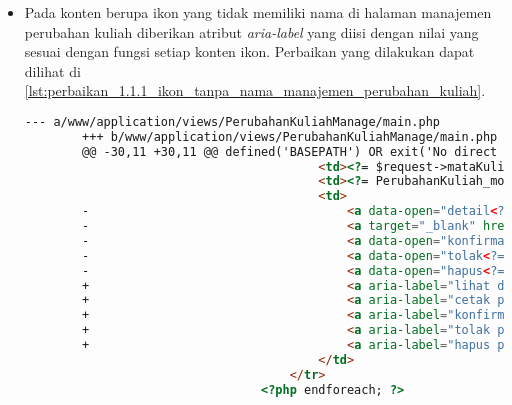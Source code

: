 \begin{itemize}
    \item Pada konten berupa ikon yang tidak memiliki nama di halaman manajemen perubahan kuliah diberikan atribut \textit{aria-label} yang diisi dengan nilai yang sesuai dengan fungsi setiap konten ikon. Perbaikan yang dilakukan dapat dilihat di \ref{lst:perbaikan_1.1.1_ikon_tanpa_nama_manajemen_perubahan_kuliah}.
    \begin{lstlisting}[frame=single, label={lst:perbaikan_1.1.1_ikon_tanpa_nama_manajemen_perubahan_kuliah}, language=HTML, caption=Perbaikan Kriteria Sukses 1.1.1 - Ikon Tanpa Nama di Halaman Manajemen Perubahan Kuliah]
        --- a/www/application/views/PerubahanKuliahManage/main.php
        +++ b/www/application/views/PerubahanKuliahManage/main.php
        @@ -30,11 +30,11 @@ defined('BASEPATH') OR exit('No direct script access allowed');
                                         <td><?= $request->mataKuliahCode ?></td>
                                         <td><?= PerubahanKuliah_model::CHANGETYPE_TYPES[$request->changeType] ?></td>
                                         <td>
        -                                    <a data-open="detail<?= $request->id ?>"><i class="fi-eye"></i></a>
        -                                    <a target="_blank" href="/PerubahanKuliahManage/printview/<?= $request->id ?>"><i class="fi-print"></i></a>
        -                                    <a data-open="konfirmasi<?= $request->id ?>"><i class="fi-like"></i></a>                                    
        -                                    <a data-open="tolak<?= $request->id ?>"><i class="fi-dislike"></i></a>
        -                                    <a data-open="hapus<?= $request->id ?>"><i class="fi-trash"></i></a>
        +                                    <a aria-label="lihat detail permohonan" data-open="detail<?= $request->id ?>"><i class="fi-eye"></i></a>
        +                                    <a aria-label="cetak permohonan" target="_blank" href="/PerubahanKuliahManage/printview/<?= $request->id ?>"><i class="fi-print"></i></a>
        +                                    <a aria-label="konfirmasi permohonan" data-open="konfirmasi<?= $request->id ?>"><i class="fi-like"></i></a>                                    
        +                                    <a aria-label="tolak permohonan" data-open="tolak<?= $request->id ?>"><i class="fi-dislike"></i></a>
        +                                    <a aria-label="hapus permohonan" data-open="hapus<?= $request->id ?>"><i class="fi-trash"></i></a>
                                         </td>
                                     </tr>
                                 <?php endforeach; ?>
    \end{lstlisting}
\end{itemize}

